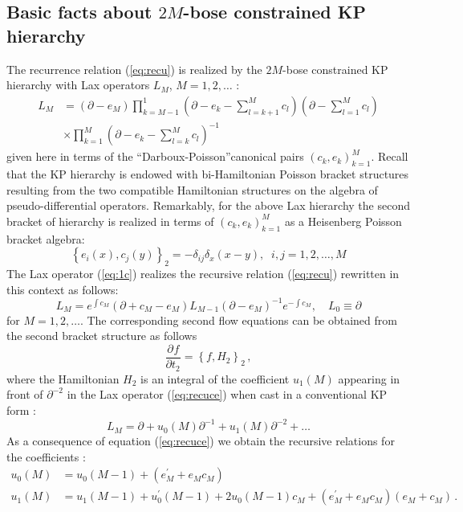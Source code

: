 \documentclass[12pt]{article}
\numberwithin{equation}{section}
\def\rf#1{(\ref{eq:#1})}
\def\lab#1{\label{eq:#1}}
\def\nonu{\nonumber}
\providecommand*{\pder}[3][]{%
\frac{\partial^{#1}#2}{\partial #3^{#1}}}
\begin{document}
\subsection{Basic facts about $2M$-bose constrained KP hierarchy}
The recurrence relation \rf{recu} is realized by 
the $2M$-bose constrained KP hierarchy with
Lax operators $L_{M}$, $M=1,2,\ldots$ :
\begin{align}
L_{M} &=  \left( \partial - e_{M} \right) \prod_{k=M-1}^1 \left( \partial - e_k -
\sum_{l=k+1}^{M} c_l \right) \left( \partial - \sum_{l=1}^{M} c_l \right) \nonu\\
&\times \prod_{k=1}^{M}
\left( \partial - e_k - \sum_{l=k}^{M} c_l \right)^{-1}  \lab{1c}
\end{align}
given here in terms of the ``Darboux-Poisson''canonical pairs $(c_k,e_k)_{k=1}^{M}$.
Recall that  the KP hierarchy is endowed with bi-Hamiltonian
Poisson bracket structures resulting from the two compatible Hamiltonian
structures on the algebra of pseudo-differential operators.
Remarkably, for the above Lax hierarchy the second bracket of hierarchy is 
realized in terms  of $(c_k,e_k)_{k=1}^{M}$
as a Heisenberg Poisson bracket algebra:
\begin{equation}
\left\{ e_i (x), c_j (y)\right\}_2 = - \delta_{ij} \delta_x (x-y), \;\;
i,j =1,2, \ldots, M
\lab{2bracket}
\end{equation}
The Lax operator \rf{1c} realizes the recursive relation 
\rf{recu} rewritten in this context as follows:
\begin{equation}
L_{M} = e^{\int c_{M}} \left( \partial + c_{M} - e_{M} \right) L_{M-1}
\left( \partial - e_{M} \right)^{-1} e^{-\int c_{M}} 
, \quad L_0 \equiv \partial 
\lab{recuce}
\end{equation}
for $M=1,2, \ldots $.
The corresponding second flow equations can be obtained from the second
bracket structure as follows 
\begin{equation}
\pder{f}{t_2}= \left\{ f , H_2 \right\}_2\, , 
\lab{ft2}
\end{equation}
where the Hamiltonian $H_2$ 
is an integral of the coefficient $u_1 (M)$ appearing in front of 
$\partial^{-2}$ in the Lax operator \rf{recuce} when cast in a conventional KP form :
\[
L_{M}  =\partial+u_0 (M) \partial^{-1}+u_1 (M) \partial^{-2} +{\ldots} 
\]
As a consequence of equation \rf{recuce}
we obtain the recursive relations for the coefficients :
\[
\begin{split}
u_0 (M) &= u_0 (M-1) + \left(e^{\prime}_{M} + e_{M} c_{M} \right)\\
u_1 (M) &= u_1 (M-1) +u_0^{\prime}  (M-1)+ 2 u_0 (M-1) c_{M}
+ \left(e^{\prime}_{M} + e_{M} c_{M} \right) 
\left(e_{M}+ c_{M} \right) \, .
\end{split}
\]
\end{document}
